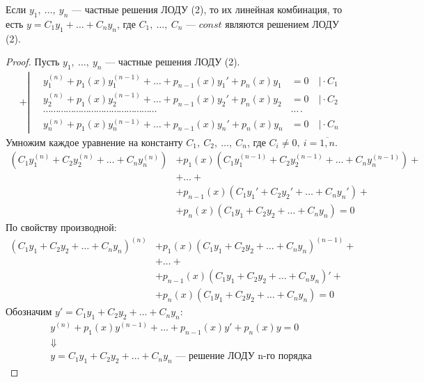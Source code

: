 \newpage
\begin{theorem}
    Если $y_1,\ \ldots,\ y_n$ --- частные решения ЛОДУ (2), то их линейная комбинация, то есть $y = C_1y_1 + \ldots + C_ny_n$, где $C_1,\ \ldots,\ C_n$ --- $const$ являются решением ЛОДУ (2).
\end{theorem}
\begin{proof}
    Пусть $y_1,\ \ldots,\ y_n$ --- частные решения ЛОДУ (2).
    \begin{align*}
        + \left|\quad\begin{aligned}
            y_1^{(n)} + p_1(x)y_1^{(n-1)} + \ldots + p_{n-1}(x)y_1' + p_n(x)y_1 &= 0\quad \Big| \cdot C_1 \\ 
            y_2^{(n)} + p_1(x)y_2^{(n-1)} + \ldots + p_{n-1}(x)y_2' + p_n(x)y_2 &= 0\quad \Big| \cdot C_2 \\
            \cdots\cdots\cdots\cdots\cdots\cdots\cdots\cdots\cdots\cdots\cdots\cdots\cdots\cdots\cdots&\cdots\cdot \\
            y_n^{(n)} + p_1(x)y_n^{(n-1)} + \ldots + p_{n-1}(x)y_n' + p_n(x)y_n &= 0\quad \Big| \cdot C_n
        \end{aligned}\right.
    \end{align*}
    Умножим каждое уравнение на константу $C_1,\ C_2,\ \ldots,\ C_n$, где $C_i \ne 0,\ i = \overline{1,n}$.
    \begin{align*}
        \left(C_1y_1^{(n)} + C_2y_2^{(n)} + \ldots + C_ny_n^{(n)}\right) &+ p_1(x)\left(C_1y_1^{(n-1)} + C_2y_2^{(n-1)} + \ldots + C_ny_n^{(n-1)}\right) + \\ 
        &+ \ldots + \\ 
        &+ p_{n-1}(x) \left(C_1y_1' + C_2y_2' + \ldots + C_ny_n'\right) + \\ 
        &+ p_{n}(x) \left(C_1y_1 + C_2y_2 + \ldots + C_ny_n\right) = 0
    \end{align*}
    По свойству производной:
    \begin{align*}
        \left(C_1y_1 + C_2y_2 + \ldots + C_ny_n\right)^{(n)} &+ p_1(x)\left(C_1y_1 + C_2y_2 + \ldots + C_ny_n\right)^{(n-1)} + \\ 
        &+ \ldots + \\ 
        &+ p_{n-1}(x) \left(C_1y_1 + C_2y_2 + \ldots + C_ny_n\right)' + \\ 
        &+ p_{n}(x) \left(C_1y_1 + C_2y_2 + \ldots + C_ny_n\right) = 0
    \end{align*}
    Обозначим $y' = C_1y_1 + C_2y_2 + \ldots + C_ny_n$:
    \begin{gather*}
        y^{(n)} + p_1(x) y^{(n-1)} + \ldots + p_{n-1} (x)y' + p_n(x) y = 0 \\
        \Downarrow \\
        y = C_1y_1 + C_2y_2 + \ldots + C_ny_n \text{ --- решение ЛОДУ n-го порядка}
    \end{gather*}
\end{proof}

